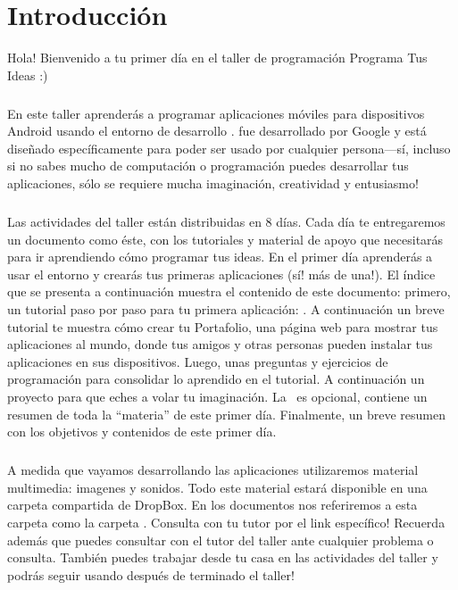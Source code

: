 \chapter*{Introducción}


Hola! Bienvenido a tu primer día en el taller de programación Programa Tus Ideas :)

\paragraph{}
En este taller aprenderás a programar aplicaciones móviles para dispositivos Android usando el entorno de desarrollo \AppInventor. \AppInventor fue desarrollado por Google y está diseñado específicamente para poder ser usado por cualquier persona---sí, incluso si no sabes mucho de computación o programación puedes desarrollar tus aplicaciones, sólo se requiere mucha imaginación, creatividad y entusiasmo!

\paragraph{}
Las actividades del taller están distribuidas en 8 días. Cada día te entregaremos un documento como éste, con los tutoriales y material de apoyo que necesitarás para ir aprendiendo cómo programar tus ideas. En el primer día aprenderás a usar el entorno \AppInventor y crearás tus primeras aplicaciones (sí! más de una!). El índice que se presenta a continuación muestra el contenido de este documento: primero, un tutorial paso por paso para tu primera aplicación: . A continuación un breve tutorial te muestra cómo crear tu Portafolio, una página web para mostrar tus aplicaciones al mundo, donde tus amigos y otras personas pueden instalar tus aplicaciones en sus dispositivos. Luego, unas preguntas y ejercicios de programación para consolidar lo aprendido en el tutorial. A continuación un proyecto para que eches a volar tu imaginación. La~ es opcional, contiene un resumen de toda la ``materia'' de este primer día. Finalmente, un breve resumen con los objetivos y contenidos de este primer día.

\paragraph{}
A medida que vayamos desarrollando las aplicaciones utilizaremos material multimedia: imagenes y sonidos. Todo este material estará disponible en una carpeta compartida de DropBox. En los documentos nos referiremos a esta carpeta como la carpeta . Consulta con tu tutor por el link específico! Recuerda además que puedes consultar con el tutor del taller ante cualquier problema o consulta. También puedes trabajar desde tu casa en las actividades del taller y podrás seguir usando \AppInventor después de terminado el taller!
